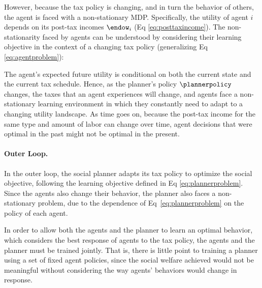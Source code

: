 However, because the tax policy is changing, and in turn the behavior of others, the agent is faced with a non-stationary MDP.
Specifically, the utility of agent $i$ depends on its post-tax incomes $\endow_i$ (Eq \ref{eq:posttaxincome}).
The non-stationarity faced by agents can be understood by considering their learning objective in the context of a changing tax policy (generalizing Eq \ref{eq:agentproblem}):




The agent's expected future utility  is conditional on both the current state and the current tax schedule.
Hence, as the planner's policy $\plannerpolicy$ changes, the taxes  that an agent experiences will change, and agents face a non-stationary learning environment in which they constantly need to adapt to a changing utility landscape.
As time goes on, because the post-tax income for the same type and amount of labor can change over time, agent decisions that were optimal in the past might not be optimal in the present.


\paragraph{Outer Loop.}
In the outer loop, the social planner adapts its tax policy to optimize the social objective, following the learning objective defined in Eq \ref{eq:plannerproblem}.
Since the agents also change their behavior, the planner also faces a non-stationary problem, due to the dependence of Eq~\ref{eq:plannerproblem} on the policy of each agent.

In order to allow both  the agents and the planner to learn an optimal behavior, which considers the best response of agents to the tax policy, the agents and the planner must be trained jointly.
That is, there is little point to training a planner using a set of fixed agent policies, since the social welfare achieved  would not be meaningful without considering the way agents' behaviors would change in response.

